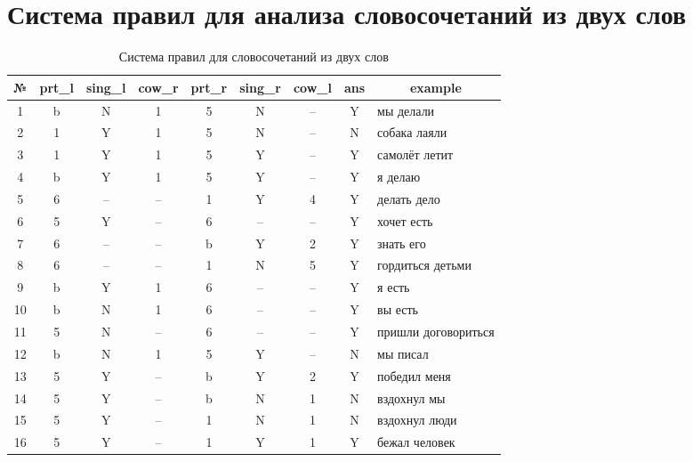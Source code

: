 \documentclass[main]{subfiles}
\begin{document}
\section{Система правил для анализа словосочетаний из двух слов}\label{app:B}
\begin{table}[!h]
	\begin{center}
		\captionsetup{format=hang,labelsep = endash, singlelinecheck=false}
	\caption{Система правил для словосочетаний из двух слов}
		\begin{tabular}{|c|c|c|c|c|c|c|c|p{90px}|}
			\hline
			\textbf{№} & \textbf{prt\_l} &\textbf{ sing\_l}  & \textbf{cow\_r} & \textbf{prt\_r }& \textbf{sing\_r} & \textbf{cow\_l} & \textbf{ans}  & \multicolumn{1}{c|}{\textbf{example}} \\ \hline
			1 & b & N & 1 & 5 & N & --  & Y  & мы делали \\ \hline
			2 &  1 &Y & 1 & 5 & N & -- & N & собака лаяли\\ \hline
			3 & 1 & Y & 1 & 5 & Y & -- & Y & самолёт летит\\ \hline 
			4 & b & Y & 1 & 5 & Y & -- & Y & я делаю \\ \hline
			5&6&--&--&1&Y&4&Y&делать дело\\ \hline
			6&5&Y&--&6&--&--&Y&хочет есть\\ \hline
			7&6&--&--&b&Y&2&Y&знать его\\ \hline
			8&6&--&--&1&N&5&Y&гордиться детьми\\ \hline
			9&b&Y&1&6&--&--&Y&я есть\\ \hline
			10&b&N&1&6&--&--&Y&вы есть \\ \hline
			11&5&N&--&6&--&--&Y&пришли договориться\\ \hline
			12&b&N&1&5&Y&--&N&мы писал\\ \hline
			13&5&Y&--&b&Y&2&Y&победил меня\\ \hline
			14&5&Y&--&b&N&1&N&вздохнул мы\\ \hline
			15&5&Y&--&1&N&1&N&вздохнул люди\\ \hline
			16&5&Y&--&1&Y&1&Y&бежал человек \\ \hline
		\end{tabular}
	\end{center}
\end{table}
\end{document}

